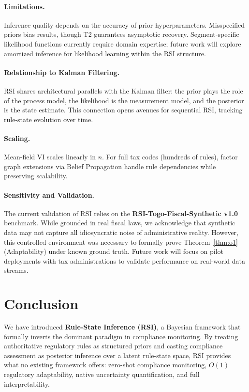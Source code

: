 \documentclass[letterpaper]{article}
\begin{document}
\paragraph{Limitations.}
Inference quality depends on the accuracy of prior hyperparameters.
Misspecified priors bias results, though T2 guarantees asymptotic
recovery. Segment-specific likelihood functions currently require
domain expertise; future work will explore amortized inference for
likelihood learning within the RSI structure.

\paragraph{Relationship to Kalman Filtering.}
RSI shares architectural parallels with the Kalman filter: the prior
plays the role of the process model, the likelihood is the measurement
model, and the posterior is the state estimate. This connection opens
avenues for sequential RSI, tracking rule-state evolution over time.

\paragraph{Scaling.}
Mean-field VI scales linearly in $n$. For full tax codes (hundreds of
rules), factor graph extensions via Belief Propagation handle rule
dependencies while preserving scalability.

\paragraph{Sensitivity and Validation.} 
The current validation of RSI relies on the \textbf{RSI-Togo-Fiscal-Synthetic v1.0} benchmark. 
While grounded in real fiscal laws, we acknowledge that synthetic data may not capture all 
idiosyncratic noise of administrative reality. However, this controlled environment was 
necessary to formally prove Theorem~\ref{thm:o1} (Adaptability) under known ground truth. 
Future work will focus on pilot deployments with tax administrations to validate performance 
on real-world data streams.

\section{Conclusion}
\label{sec:conclusion}

We have introduced \textbf{Rule-State Inference (RSI)}, a Bayesian
framework that formally inverts the dominant paradigm in compliance
monitoring. By treating authoritative regulatory rules as structured
priors and casting compliance assessment as posterior inference over
a latent rule-state space, RSI provides what no existing framework
offers: zero-shot compliance monitoring, $O(1)$ regulatory adaptability,
native uncertainty quantification, and full interpretability.
\end{document}
